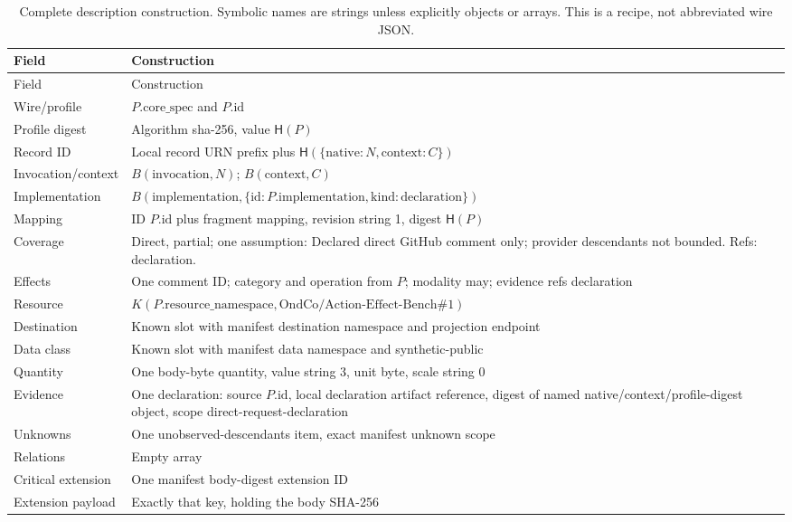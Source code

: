 \documentclass[11pt,letterpaper]{article}
\newcommand{\Hash}{\mathsf{H}}
\begin{document}
\begin{longtable}{@{}L{.26\linewidth}L{.68\linewidth}@{}}
\caption{Complete description construction. Symbolic names are strings unless
explicitly objects or arrays. This is a recipe, not abbreviated wire JSON.}
\label{tab:construction}\\
\toprule Field & Construction \\ \midrule
\endfirsthead
\toprule Field & Construction \\ \midrule
\endhead
Wire/profile & $P.\mathrm{core\_spec}$ and $P.\mathrm{id}$ \\
Profile digest & Algorithm sha-256, value $\Hash(P)$ \\
Record ID & Local record URN prefix plus $\Hash(\{\mathrm{native}:N,\mathrm{context}:C\})$ \\
Invocation/context & $B(\mathrm{invocation},N)$; $B(\mathrm{context},C)$ \\
Implementation & $B(\mathrm{implementation},\{\mathrm{id}:P.\mathrm{implementation},\mathrm{kind}:\mathrm{declaration}\})$ \\
Mapping & ID $P.\mathrm{id}$ plus fragment mapping, revision string 1, digest $\Hash(P)$ \\
Coverage & Direct, partial; one assumption: Declared direct GitHub comment only; provider descendants not bounded. Refs: declaration. \\
Effects & One comment ID; category and operation from $P$; modality may; evidence refs declaration \\
Resource & $K(P.\mathrm{resource\_namespace},\mathrm{OndCo/Action\text{-}Effect\text{-}Bench\#1})$ \\
Destination & Known slot with manifest destination namespace and projection endpoint \\
Data class & Known slot with manifest data namespace and synthetic-public \\
Quantity & One body-byte quantity, value string 3, unit byte, scale string 0 \\
Evidence & One declaration: source $P.\mathrm{id}$, local declaration artifact reference, digest of named native/context/profile-digest object, scope direct-request-declaration \\
Unknowns & One unobserved-descendants item, exact manifest unknown scope \\
Relations & Empty array \\
Critical extension & One manifest body-digest extension ID \\
Extension payload & Exactly that key, holding the body SHA-256 \\
\bottomrule
\end{longtable}
\end{document}

